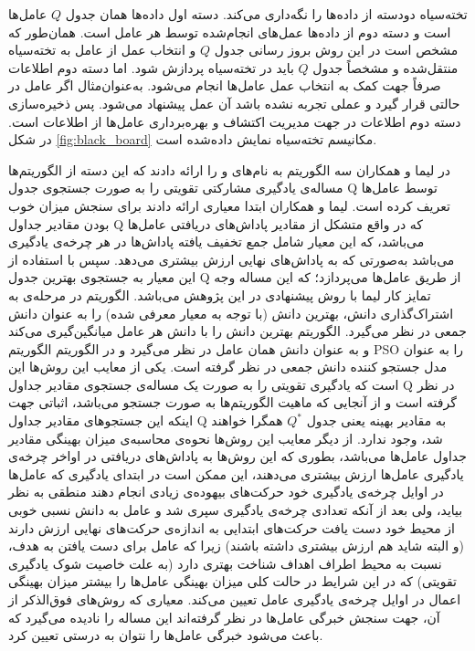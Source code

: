 تخته‌سیاه دودسته از داده‌ها را نگه‌داری می‌کند. دسته اول داده‌ها همان جدول $Q$ عامل‌ها است و دسته دوم از داده‌ها عمل‌های انجام‌شده توسط هر عامل است. همان‌طور که مشخص است در این روش بروز رسانی جدول $Q$ و انتخاب عمل از عامل به تخته‌سیاه منتقل‌شده و مشخصاً جدول $Q$ باید در تخته‌سیاه پردازش شود. اما دسته دوم اطلاعات صرفاً جهت کمک به انتخاب عمل عامل‌ها انجام می‌شود. به‌عنوان‌مثال اگر عامل در حالتی قرار گیرد و عملی تجربه نشده باشد آن عمل پیشنهاد می‌شود. پس ذخیره‌سازی دسته دوم اطلاعات در جهت مدیریت اکتشاف و بهره‌برداری عامل‌ها از اطلاعات است. در شکل \ref{fig:black_board} مکانیسم تخته‌سیاه نمایش داده‌شده است.


در  لیما و همکاران سه الگوریتم به نام‌های  و  را ارائه دادند که این دسته از الگوریتم‌ها مساله‌ی یادگیری مشارکتی تقویتی را به صورت جستجوی‌ جدول Q توسط عامل‌ها تعریف کرده است. لیما و همکاران ابتدا معیاری ارائه دادند برای سنجش میزان خوب بودن مقادیر جداول Q که در واقع متشکل از مقادیر پاداش‌های دریافتی عامل‌ها می‌باشد، که این معیار شامل جمع تخفیف یافته پاداش‌ها در هر چرخه‌ی یادگیری می‌باشد به‌صورتی که به پاداش‌های نهایی ارزش بیشتری می‌دهد. سپس با استفاده از این معیار به جستجوی بهترین جدول Q از طریق عامل‌ها می‌پردازد؛ که این مساله وجه تمایز کار لیما با روش پیشنهادی در این پژوهش می‌باشد. الگوریتم  در مرحله‌ی به اشتراک‌گذاری دانش، بهترین دانش (با توجه به معیار معرفی شده) را به عنوان دانش جمعی در نظر می‌گیرد. الگوریتم  بهترین دانش را با دانش هر عامل میانگین‌گیری می‌کند و به عنوان دانش همان عامل در نظر می‌گیرد و در الگوریتم  الگوریتم PSO را به عنوان مدل جستجو کننده‌ دانش جمعی در نظر گرفته است.
یکی از معایب این روش‌ها این است که یادگیری تقویتی را به صورت یک مساله‌ی جستجوی مقادیر جداول Q در نظر گرفته است و از آنجایی که ماهیت الگوریتم‌ها به صورت جستجو می‌باشد، اثباتی جهت اینکه این جستجو‌های مقادیر جداول Q به مقادیر بهینه یعنی جدول $Q^*$ همگرا خواهند شد، وجود ندارد. از دیگر معایب این روش‌ها نحوه‌ی محاسبه‌ی میزان بهینگی مقادیر جداول عامل‌ها می‌باشد، بطوری که این روش‌ها به پاداش‌های دریافتی در اواخر چرخه‌ی یادگیری عامل‌ها ارزش بیشتری می‌دهند، این ممکن است در ابتدای یادگیری که عامل‌ها در اوایل چرخه‌ی یادگیری خود حرکت‌های بیهوده‌ی زیادی انجام دهند منطقی به نظر بیاید، ولی بعد از آنکه تعدادی چرخه‌ی یادگیری سپری شد و عامل به دانش نسبی خوبی از محیط خود دست یافت حرکت‌های ابتدایی به اندازه‌ی حرکت‌های نهایی ارزش دارند (و البته شاید هم ارزش بیشتری داشته باشند) زیرا که عامل برای دست یافتن به هدف، نسبت به محیط‌ اطراف اهداف شناخت بهتری دارد (به علت خاصیت شوک یادگیری تقویتی) که در این شرایط در حالت کلی میزان بهینگی عامل‌ها را بیشتر میزان بهینگی اعمال در اوایل چرخه‌ی یادگیری عامل تعیین می‌کند. معیاری که روش‌های فوق‌الذکر از آن، جهت سنجش خبرگی عامل‌ها در نظر گرفته‌اند این مساله را نادیده می‌گیرد که باعث می‌شود خبرگی عامل‌ها را نتوان به درستی تعیین کرد.

